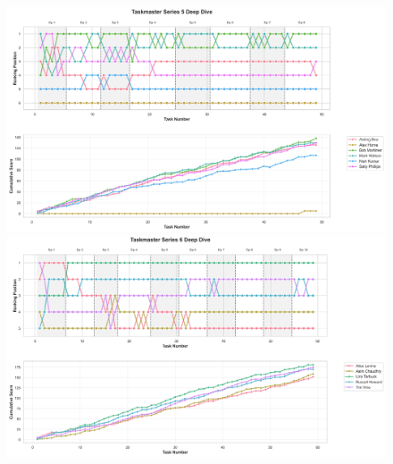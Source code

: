 \documentclass[10pt,letterpaper]{article}
\begin{document}
\begin{figure}[!h]
\centering
\includegraphics[width=\linewidth]{figures/supplementary/series_5_deep_dive.png}
\includegraphics[width=\linewidth]{figures/supplementary/series_6_deep_dive.png}
\end{figure}
\FloatBarrier
\clearpage
\end{document}
